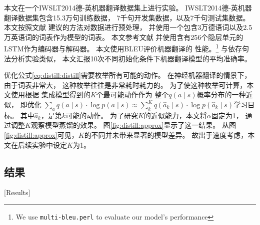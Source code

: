 本文在一个IWSLT2014德-英机器翻译数据集上进行实验。
IWSLT2014德-英机器翻译数据集包含15.3万句训练数据，
7千句开发集数据，以及7千句测试集数据。
本文按照文献
建议的方法对数据进行预处理，
并使用一个包含3万德语词以及2.5万英语词的词表作为模型的词表。
本文参考文献
并使用含有256个隐层单元的LSTM作为编码器与解码器。
本文使用BLEU\cite{papineni-EtAl:2002:ACL}评价机器翻译的
性能。\footnote{We use {\tt multi-bleu.perl} to evaluate our model's performance}
与依存句法分析实验类似，
本文汇报10次不同初始化条件下机器翻译模型的平均准确率。

优化公式\ref{eq:distill:distill}需要枚举所有可能的动作。
在神经机器翻译的情景下，由于词表非常大，
这种枚举往往是非常耗时耗力的。
为了使这种枚举可计算，本文使用根据
集成模型得到的$K$个最可能动作作为
整个$q(a\mid s)$概率分布的一种近似，
即优化
$\sum_a q(a \mid s) \cdot \log p(a \mid s) \approx
\sum_k^K q(\hat{a}_k \mid s) \cdot \log p(\hat{a}_k \mid s)$学习目标。
其中$\hat{a}_k$，是第$k$可能的动作。
为了研究$K$的近似能力，本文将$\alpha$固定为1，
通过调整$K$观察模型蒸馏的效果。
图\ref{fig:distill:approx}显示了这一结果。
从图\ref{fig:distill:approx}可见，$K$的不同并未带来显著的模型差异。
故出于速度考虑，本文在后续实验中设定$K$为1。

\subsection{结果}[Results]\label{sec:distill:exp-res}


